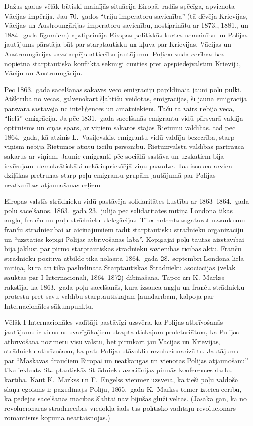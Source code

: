 \documentclass[twoside,a5paper,12pt,fleqn,openany]{extbook}
\begin{document}
Dažus gadus vēlāk būtiski mainījās situācija Eiropā, radās spēcīga, apvienota Vācijas impērija. Jau 70.~gados ``triju imperatoru savienība'' (tā dēvēja Krievijas, Vācijas un Austroungārijas imperatoru savienību, nostiprinātu ar 1873., 1881., un 1884.~gada līgumiem) apstiprināja Eiropas politiskās kartes nemainību un Polijas jautājums pārstāja būt par starptautisku un kļuva par Krievijas, Vācijas un Austroungārijas savstarpējo attiecību jautājumu. Poļiem zuda cerības bez nopietna starptautiska konflikta sekmīgi cīnīties pret apspiedējvalstīm Krieviju, Vāciju un Austroungāriju.

Pēc 1863.~gada sacelšanās sakāves veco emigrāciju papildināja jauni poļu pulki. Atšķirībā no vecās, galvenokārt šļahtiču veidotās, emigrācijas, šī jaunā emigrācija pārsvarā sastāvēja no inteliģences un amatniekiem. Taču tā vairs nebija vecā, ``lielā'' emigrācija. Ja pēc 1831.~gada sacelšanās emigrantu vidū pārsvarā valdīja optimisms un cīņas spars, ar viņiem sakaros stājās Rietumu valdības, tad pēc 1864.~gada, kā atzinis L.~Vasiļevskis, emigrantu vidū valdīja bezcerība, starp viņiem nebija Rietumos atzītu izcilu personību. Rietumvalstu valdības pārtrauca sakarus ar viņiem. Jaunie emigranti pēc sociālā sastāva un uzskatiem bija ievērojami demokrātiskāki nekā iepriekšējā viņu paaudze. Tas izsauca arvien dziļākas pretrunas starp poļu emigrantu grupām jautājumā par Polijas neatkarības atjaunošanas ceļiem.

Eiropas valstīs strādnieku vidū pastāvēja solidaritātes kustība ar 1863--1864.~gada poļu sacelšanos. 1863.~gada 23.~jūlijā pēc solidaritātes mītiņa Londonā tikās angļu, franču un poļu strādnieku delegācijas. Tika nolemts sagatavot uzsaukumu franču strādniecībai ar aicinājumiem radīt starptautisku strādnieku organizāciju un ``uzstāties kopīgi Polijas atbrīvošanas labā''. Kopīgajai poļu tautas aizstāvībai bija jākļūst par pirmo starptautiskās strādnieku savienības rīcības aktu. Franču strādnieku pozitīvā atbilde tika nolasīta 1864.~gada 28.~septembrī Londonā lielā mītiņā, kurā arī tika pasludināta Starptautiskās Strādnieku asociācijas (vēlāk sauktas par I Internacionāli, 1864--1872) dibināšana. Tāpēc arī K.~Markss rakstīja, ka 1863.~gada poļu sacelšanās, kura izsauca angļu un franču strādnieku protestu pret savu valdību starptautiskajām ļaundarībām, kalpoja par Internacionāles sākumpunktu.

Vēlāk I Internacionāles vadītāji pastāvīgi uzsvēra, ka Polijas atbrīvošanās jautājums ir viens no svarīgākajiem straptautiskajam proletariātam, ka Polijas atbrīvošana nozīmētu visu valstu, bet pirmkārt jau Vācijas un Krievijas, strādnieku atbrīvošanu, ka pats Polijas stāvoklis revolucionarizē to. Jautājums par ``Maskavas draudiem Eiropai un neatkarīgas un vienotas Polijas atjaunošanu'' tika iekļauts Starptautiskās Strādnieku asociācijas pirmās konferences darba kārtībā. Kaut K.~Markss un F.~Engelss vienmēr uzsvēra, ka tieši poļu valdošo slāņu egoisms ir pazudinājis Poliju, 1865.~gadā K.~Markss tomēr izteica cerību, ka pēdējās sacelšanās mācības šļahtai nav bijušas gluži veltas. (Jāsaka gan, ka no revolucionārās strādniecības viedokļa šāds tās politisko vadītāju revolucionārs romantisms kopumā neattaisnojās.)
\end{document}
